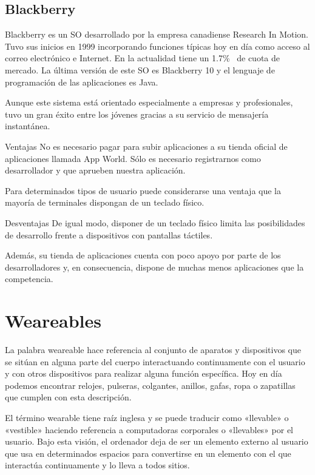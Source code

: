 \subsection{Blackberry}

Blackberry es un \acs{SO} desarrollado por la empresa canadiense Research In Motion. Tuvo sus
inicios en 1999 incorporando funciones típicas hoy en día como acceso al correo electrónico e
Internet. En la actualidad tiene un 1.7\%~\cite{Llamas13} de cuota de mercado. La última versión de
este \acs{SO} es Blackberry 10 y el lenguaje de programación de las aplicaciones es Java.

Aunque este sistema está orientado especialmente a empresas y profesionales, tuvo un gran éxito
entre los jóvenes gracias a su servicio de mensajería instantánea.

\begin{definitionlist}
  \item[Ventajas] No es necesario pagar para subir aplicaciones a su tienda oficial de aplicaciones
    llamada App World. Sólo es necesario registrarnos como desarrollador y que aprueben nuestra
    aplicación.

    Para determinados tipos de usuario puede considerarse una ventaja que la mayoría de terminales
    dispongan de un teclado físico.

  \item[Desventajas] De igual modo, disponer de un teclado físico limita las posibilidades de
    desarrollo frente a dispositivos con pantallas táctiles.

    Además, su tienda de aplicaciones cuenta con poco apoyo por parte de los desarrolladores y, en
    consecuencia, dispone de muchas menos aplicaciones que la competencia.

\end{definitionlist}

\section{Weareables}

La palabra weareable hace referencia al conjunto de aparatos y dispositivos que se sitúan en alguna
parte del cuerpo interactuando continuamente con el usuario y con otros dispositivos para realizar
alguna función específica. Hoy en día podemos encontrar relojes, pulseras, colgantes, anillos,
gafas, ropa o zapatillas que cumplen con esta descripción.

El término wearable tiene raíz inglesa y se puede traducir como «llevable» o «vestible» haciendo
referencia a computadoras corporales o «llevables» por el usuario. Bajo esta visión, el ordenador
deja de ser un elemento externo al usuario que usa en determinados espacios para convertirse en un
elemento con el que interactúa continuamente y lo lleva a todos sitios.

